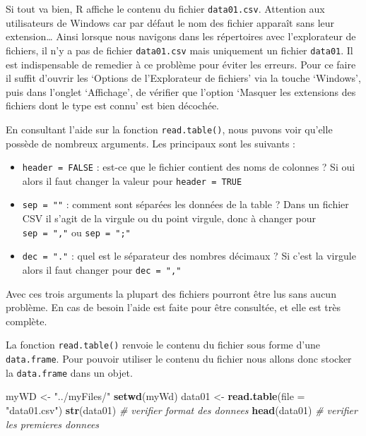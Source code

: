 \documentclass[]{book}
\newenvironment{Shaded}{\begin{snugshade}}{\end{snugshade}}
\newcommand{\KeywordTok}[1]{\textcolor[rgb]{0.13,0.29,0.53}{\textbf{#1}}}
\newcommand{\DataTypeTok}[1]{\textcolor[rgb]{0.13,0.29,0.53}{#1}}
\newcommand{\StringTok}[1]{\textcolor[rgb]{0.31,0.60,0.02}{#1}}
\newcommand{\CommentTok}[1]{\textcolor[rgb]{0.56,0.35,0.01}{\textit{#1}}}
\newcommand{\NormalTok}[1]{#1}
\providecommand{\tightlist}{%
  \setlength{\itemsep}{0pt}\setlength{\parskip}{0pt}}
\theoremstyle{definition}
\theoremstyle{definition}
\theoremstyle{definition}
\theoremstyle{remark}
\begin{document}
Si tout va bien, R affiche le contenu du fichier \texttt{data01.csv}.
Attention aux utilisateurs de Windows car par défaut le nom des fichier
apparaît sans leur extension\ldots{} Ainsi lorsque nous navigons dans
les répertoires avec l'explorateur de fichiers, il n'y a pas de fichier
\texttt{data01.csv} mais uniquement un fichier \texttt{data01}. Il est
indispensable de remedier à ce problème pour éviter les erreurs. Pour ce
faire il suffit d'ouvrir les `Options de l'Explorateur de fichiers' via
la touche `Windows', puis dans l'onglet `Affichage', de vérifier que
l'option `Masquer les extensions des fichiers dont le type est connu'
est bien décochée.

En consultant l'aide sur la fonction \texttt{read.table()}, nous puvons
voir qu'elle possède de nombreux arguments. Les principaux sont les
suivants :

\begin{itemize}
\tightlist
\item
  \texttt{header\ =\ FALSE} : est-ce que le fichier contient des noms de
  colonnes ? Si oui alors il faut changer la valeur pour
  \texttt{header\ =\ TRUE}
\item
  \texttt{sep\ =\ ""} : comment sont séparées les données de la table ?
  Dans un fichier CSV il s'agit de la virgule ou du point virgule, donc
  à changer pour \texttt{sep\ =\ ","} ou \texttt{sep\ =\ ";"}
\item
  \texttt{dec\ =\ "."} : quel est le séparateur des nombres décimaux ?
  Si c'est la virgule alors il faut changer pour \texttt{dec\ =\ ","}
\end{itemize}

Avec ces trois arguments la plupart des fichiers pourront être lus sans
aucun problème. En cas de besoin l'aide est faite pour être consultée,
et elle est très complète.

La fonction \texttt{read.table()} renvoie le contenu du fichier sous
forme d'une \texttt{data.frame}. Pour pouvoir utiliser le contenu du
fichier nous allons donc stocker la \texttt{data.frame} dans un objet.

\begin{Shaded}
\begin{Highlighting}[]
\NormalTok{myWD <-}\StringTok{ "../myFiles/"}
\KeywordTok{setwd}\NormalTok{(myWd)}
\NormalTok{data01 <-}\StringTok{ }\KeywordTok{read.table}\NormalTok{(}\DataTypeTok{file =} \StringTok{"data01.csv"}\NormalTok{)}
\KeywordTok{str}\NormalTok{(data01) }\CommentTok{# verifier format des donnees}
\KeywordTok{head}\NormalTok{(data01) }\CommentTok{# verifier les premieres donnees}
\end{Highlighting}
\end{Shaded}
\end{document}
